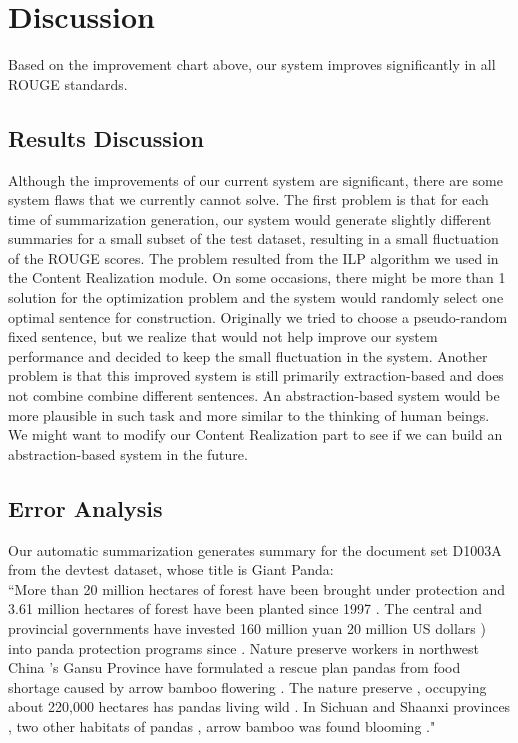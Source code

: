 \documentclass[11pt]{article}
\begin{document}
\section{Discussion}
Based on the improvement chart above, our system improves significantly in all ROUGE standards. 
\subsection{Results Discussion}
Although the improvements of our current system are significant, there are some system flaws that we currently cannot solve. The first problem is that for each time of summarization generation, our system would generate slightly different summaries for a small subset of the test dataset, resulting in a small fluctuation of the ROUGE scores. The problem resulted from the ILP algorithm we used in the Content Realization module. On some occasions, there might be more than 1 solution for the optimization problem and the system would randomly select one optimal sentence for construction. Originally we tried to choose a pseudo-random fixed sentence, but we realize that would not help improve our system performance and decided to keep the small fluctuation in the system.
\indent
Another problem is that this improved system is still primarily extraction-based and does not combine combine different sentences. An abstraction-based system would be more plausible in such task and more similar to the thinking of human beings. We might want to modify our Content Realization part to see if we can build an abstraction-based system in the future.
\subsection{Error Analysis}
Our automatic summarization generates summary for the document set D1003A from the devtest dataset, whose title is Giant Panda:\\

``More than 20 million hectares of forest have been brought under protection and 3.61 million hectares of forest have been planted since 1997 .
The central and provincial governments have invested 160 million yuan 20 million US dollars ) into panda protection programs since .
Nature preserve workers in northwest China 's Gansu Province have formulated a rescue plan pandas from food shortage caused by arrow bamboo flowering .
The nature preserve , occupying about 220,000 hectares has pandas living wild .
In Sichuan and Shaanxi provinces , two other habitats of pandas , arrow bamboo was found blooming ."\\
\end{document}
